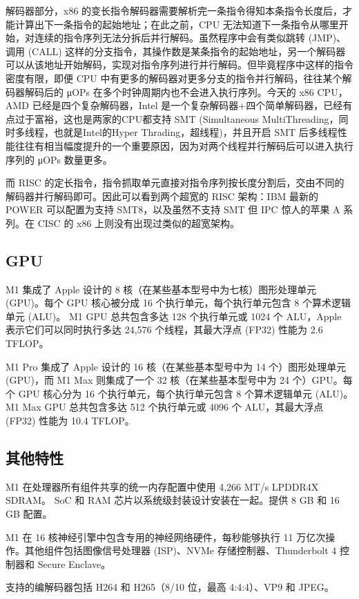\documentclass[a4paper]{article}
\begin{document}
解码器部分，x86 的变长指令解码器需要解析完一条指令得知本条指令长度后，才能计算出下一条指令的起始地址；在此之前，CPU 无法知道下一条指令从哪里开始，对连续的指令序列无法分拆后并行解码。虽然程序中会有类似跳转 (JMP)、调用 (CALL) 这样的分支指令，其操作数是某条指令的起始地址，另一个解码器可以从该地址开始解码，实现对指令序列进行并行解码。但毕竟程序中这样的指令密度有限，即便 CPU 中有更多的解码器对更多分支的指令并行解码，往往某个解码器解码后的 μOPs 在多个时钟周期内也不会进入执行序列。今天的 x86 CPU，AMD 已经是四个复杂解码器，Intel 是一个复杂解码器+四个简单解码器，已经有点过于富裕，这也是两家的CPU都支持 SMT (Simultaneous MultiThreading，同时多线程，也就是Intel的Hyper Thrading，超线程)，并且开启 SMT 后多线程性能往往有相当幅度提升的一个重要原因，因为对两个线程并行解码后可以进入执行序列的 μOPs 数量更多。


而 RISC 的定长指令，指令抓取单元直接对指令序列按长度分割后，交由不同的解码器并行解码即可。因此可以看到两个超宽的 RISC 架构：IBM 最新的 POWER 可以配置为支持 SMT8，以及虽然不支持 SMT 但 IPC 惊人的苹果 A 系列。在 CISC 的 x86 上则没有出现过类似的超宽架构。


\subsection{GPU}
M1 集成了 Apple 设计的 8 核（在某些基本型号中为七核）图形处理单元 (GPU)。每个 GPU 核心被分成 16 个执行单元，每个执行单元包含 8 个算术逻辑单元 (ALU)。 M1 GPU 总共包含多达 128 个执行单元或 1024 个 ALU，Apple 表示它们可以同时执行多达 24,576 个线程，其最大浮点 (FP32) 性能为 2.6 TFLOP。

M1 Pro 集成了 Apple 设计的 16 核（在某些基本型号中为 14 个）图形处理单元 (GPU)，而 M1 Max 则集成了一个 32 核（在某些基本型号中为 24 个）GPU。每个 GPU 核心分为 16 个执行单元，每个执行单元包含 8 个算术逻辑单元 (ALU)。 M1 Max GPU 总共包含多达 512 个执行单元或 4096 个 ALU，其最大浮点 (FP32) 性能为 10.4 TFLOP。

\subsection{其他特性}
M1 在处理器所有组件共享的统一内存配置中使用 4,266 MT/s LPDDR4X SDRAM。 SoC 和 RAM 芯片以系统级封装设计安装在一起。提供 8 GB 和 16 GB 配置。

M1 在 16 核神经引擎中包含专用的神经网络硬件，每秒能够执行 11 万亿次操作。其他组件包括图像信号处理器 (ISP)、NVMe 存储控制器、Thunderbolt 4 控制器和 Secure Enclave。

支持的编解码器包括 H264 和 H265（8/10 位，最高 4:4:4）、VP9 和 JPEG。
\end{document}
